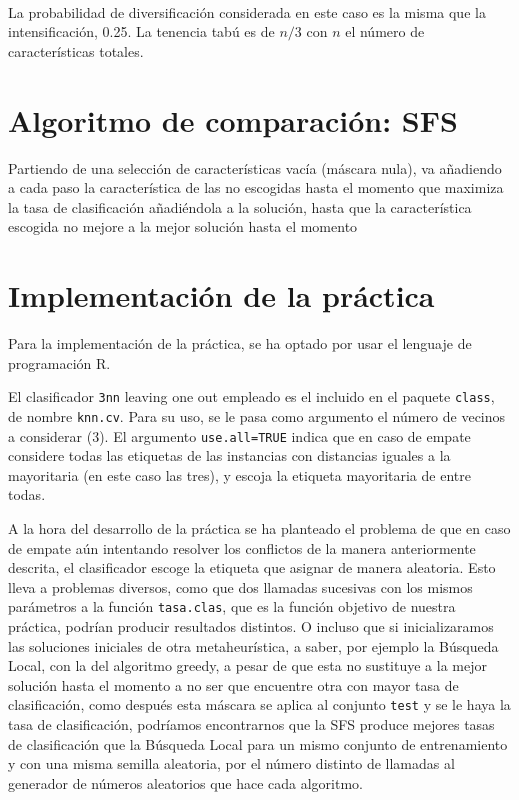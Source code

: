 \documentclass[a4paper,11pt]{article}
\begin{document}
\small{\texttt{}}
\normalsize\\

La probabilidad de diversificación considerada en este caso es la misma que la intensificación, 0.25.
La tenencia tabú es de $n/3$ con $n$ el número de características totales.

\section{Algoritmo de comparación: SFS}
\small{\texttt{}}

Partiendo de una selección de características vacía (máscara nula), va añadiendo a cada paso la característica
de las no escogidas hasta el momento que maximiza la tasa de clasificación añadiéndola a la solución, hasta
que la característica escogida no mejore a la mejor solución hasta el momento

\section{Implementación de la práctica}
Para la implementación de la práctica, se ha optado por usar el lenguaje de programación R. 

El clasificador \texttt{3nn} leaving one out empleado es el incluido en el paquete \texttt{class}, de nombre
\texttt{knn.cv}. Para su uso, se le pasa como argumento el número de vecinos a considerar (3). El argumento 
\texttt{use.all=TRUE} indica que en caso de empate considere todas las etiquetas de las instancias con distancias 
iguales a la mayoritaria (en este caso las tres), y escoja la etiqueta mayoritaria de entre todas. 

A la hora del desarrollo de la práctica se ha planteado el problema de que en caso de empate aún intentando 
resolver los conflictos de la manera anteriormente descrita, el clasificador escoge la etiqueta que
asignar de manera aleatoria. Esto lleva a problemas diversos, como que dos llamadas sucesivas con los mismos
parámetros a la función \texttt{tasa.clas}, que es la función objetivo de nuestra práctica, podrían producir resultados 
distintos. O incluso que si inicializaramos las soluciones iniciales de otra metaheurística, a saber, por ejemplo la
Búsqueda Local, con la del algoritmo greedy, a pesar de que esta no sustituye a la mejor solución hasta el momento a 
no ser que encuentre otra con mayor tasa de clasificación, como después esta máscara se aplica al conjunto 
\texttt{test} y se le haya la tasa de clasificación, podríamos encontrarnos que la SFS produce mejores tasas
de clasificación que la Búsqueda Local para un mismo conjunto de entrenamiento y con una misma semilla aleatoria, por
el número distinto de llamadas al generador de números aleatorios que hace cada algoritmo.
\end{document}
